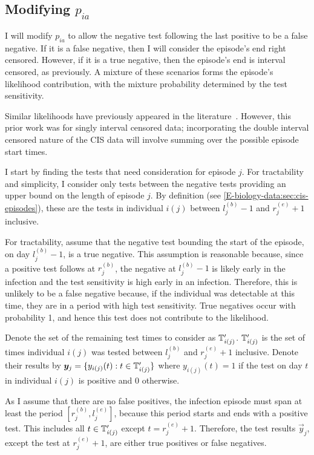 \documentclass[thesis.tex]{subfiles}
\begin{document}
\subsection{Modifying \texorpdfstring{$p_{ia}$}{pia}} \label{imperf-test:sec:modifying-p_ia}

I will modify $p_{ia}$ to allow the negative test following the last positive to be a false negative.
If it is a false negative, then I will consider the episode's end right censored.
However, if it is a true negative, then the episode's end is interval censored, as previously.
A mixture of these scenarios forms the episode's likelihood contribution, with the mixture probability determined by the test sensitivity.

Similar likelihoods have previously appeared in the literature~\autocite[e.g.][eq.\ (2)]{piresIntervalMisclassify}.
However, this prior work was for singly interval censored data; incorporating the double interval censored nature of the CIS data will involve summing over the possible episode start times.

I start by finding the tests that need consideration for episode $j$.
For tractability and simplicity, I consider only tests between the negative tests providing an upper bound on the length of episode $j$.
By definition (see \cref{E-biology-data:sec:cis-episodes}), these are the tests in individual $i(j)$ between $l_j^{(b)} - 1$ and $r_j^{(e)} + 1$ inclusive.

For tractability, assume that the negative test bounding the start of the episode, on day $l_j^{(b)}-1$, is a true negative.
This assumption is reasonable because, since a positive test follows at $r_j^{(b)}$, the negative at $l_j^{(b)}-1$ is likely early in the infection and the test sensitivity is high early in an infection.
Therefore, this is unlikely to be a false negative because, if the individual was detectable at this time, they are in a period with high test sensitivity.
True negatives occur with probability 1, and hence this test does not contribute to the likelihood.

Denote the set of the remaining test times to consider as $\mathbb{T}'_{i(j)}$.
$\mathbb{T}'_{i(j)}$ is the set of times individual $i(j)$ was tested between $l_j^{(b)}$ and $r_j^{(e)} + 1$ inclusive.
Denote their results by $\bm{y}_j = \{ y_{i(j)}(t) : t \in \mathbb{T}'_{i(j)} \}$ where $y_{i(j)}(t) = 1$ if the test on day $t$ in individual $i(j)$ is positive and 0 otherwise.

As I assume that there are no false positives, the infection episode must span at least the period $[r^{(b)}_j, l^{(e)}_j]$, because this period starts and ends with a positive test.
This includes all $t \in \mathbb{T}'_{i(j)}$ except $t = r_j^{(e)}+1$.
Therefore, the test results $\vec{y}_j$, except the test at $r_j^{(e)}+1$, are either true positives or false negatives.
\end{document}
